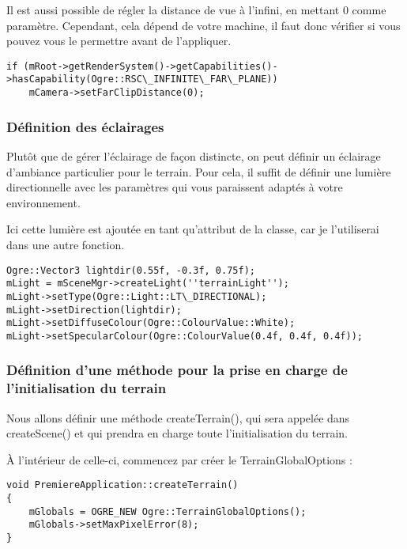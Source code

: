 \documentclass[10pt,a4paper]{report}
\begin{document}
Il est aussi possible de r\'egler la distance de vue \`a l'infini, en mettant 0 comme param\`etre. Cependant, cela d\'epend de votre machine, il faut donc v\'erifier si vous pouvez vous le permettre avant de l'appliquer.

\begin{lstlisting}[caption={V\'erification et r\'eglages de vue \`a l'infini}]
if (mRoot->getRenderSystem()->getCapabilities()->hasCapability(Ogre::RSC\_INFINITE\_FAR\_PLANE))
    mCamera->setFarClipDistance(0);
\end{lstlisting}




\subsubsection{D\'efinition des \'eclairages}
Plut\^ot que de g\'erer l'\'eclairage de fa\c{c}on distincte, on peut d\'efinir un \'eclairage d'ambiance particulier pour le terrain. Pour cela, il suffit de d\'efinir une lumi\`ere directionnelle avec les param\`etres qui vous paraissent adapt\'es \`a votre environnement. 

Ici cette lumi\`ere est ajout\'ee en tant qu'attribut de la classe, car je l'utiliserai dans une autre fonction.

\begin{lstlisting}[caption={D\'efinition de l'\'eclairage pour le terrain}]
Ogre::Vector3 lightdir(0.55f, -0.3f, 0.75f);
mLight = mSceneMgr->createLight(''terrainLight'');
mLight->setType(Ogre::Light::LT\_DIRECTIONAL);
mLight->setDirection(lightdir);
mLight->setDiffuseColour(Ogre::ColourValue::White);
mLight->setSpecularColour(Ogre::ColourValue(0.4f, 0.4f, 0.4f));
\end{lstlisting}




\subsubsection{D\'efinition d'une m\'ethode pour la prise en charge de l'initialisation du terrain}

Nous allons d\'efinir une m\'ethode createTerrain(), qui sera appel\'ee dans createScene() et qui prendra en charge toute l'initialisation du terrain.

\`A l'int\'erieur de celle-ci, commencez par cr\'eer le TerrainGlobalOptions :

\begin{lstlisting}[caption={M\'ethode pour la prise en charge de l'initialisation du terrain}]
void PremiereApplication::createTerrain()
{
    mGlobals = OGRE_NEW Ogre::TerrainGlobalOptions();
    mGlobals->setMaxPixelError(8);
}
\end{lstlisting}
\end{document}
